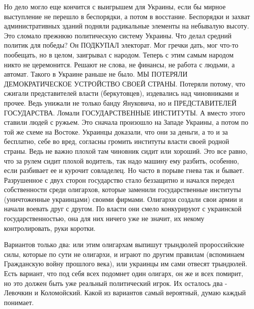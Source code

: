 Но дело могло еще кончится с выигрышем для Украины, если бы мирное выступление
не перешло в беспорядки, а потом в восстание. Беспорядки и захват
административных зданий подняли радикальные элементы на небывалую высоту. Это
сломало прежнюю политическую систему Украины. Что делал средний политик для
победы? Он ПОДКУПАЛ электорат. Мог гречки дать, мог что-то пообещать, но в
целом, заигрывал с народом. Теперь с этим самым народом никто не церемонится.
Решают не слова, не финансы, не работа с людьми, а автомат. Такого в Украине
раньше не было. МЫ ПОТЕРЯЛИ ДЕМОКРАТИЧЕСКОЕ УСТРОЙСТВО СВОЕЙ СТРАНЫ. Потеряли
потому, что сжигали представителей власти (беркутовцев), издевались над
чиновниками и прочее. Ведь унижали не только банду Януковича, но и
ПРЕДСТАВИТЕЛЕЙ ГОСУДАРСТВА. Ломали ГОСУДАРСТВЕННЫЕ ИНСТИТУТЫ. А вместо этого
ставили людей с ружьем. Это сначала произошло на Западе Украины, а потом по той
же схеме на Востоке. Украинцы доказали, что они за деньги, а то и за бесплатно,
себе во вред, согласны громить институты власти своей родной страны. Ведь не
важно плохой там чиновник сидит    или хороший. Это все равно, что за рулем
сидит плохой водитель, так надо машину ему разбить, особенно, если разбивает ее
и курочит совладелец. Но часто в порыве гнева так и бывает. Разрушенное с двух
сторон государство стало беззащитно и начался передел собственности среди
олигархов, которые заменили государственные институты (уничтоженные украинцами)
своими фирмами. Олигархи создали свои армии и начали воевать друг с другом. По
власти они смело конкурируют с украинской государственностью, она для них
ничего уже не значит, их некому контролировать, руки коротки. 

Вариантов только два:  или этим олигархам выпишут трындюлей пророссийские силы,
которые по сути не олигархи, и играют по другим правилам (вспоминаем
Гражданскую войну прошлого века), или 
украинцы им сами отвесят трындюлей. Есть вариант, что под себя всех подомнет
один олигарх, он же и всех помирит, но это должен быть уже реальный
политический игрок. Их осталось два - Левочкин и Коломойский. Какой из
вариантов самый вероятный, думаю каждый понимает.
